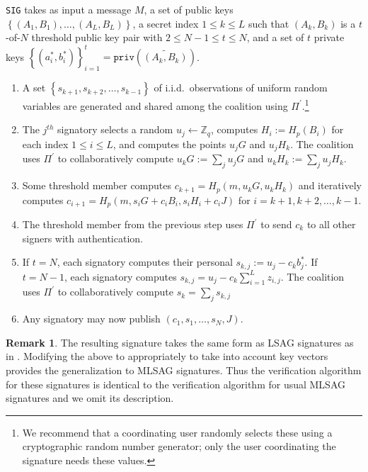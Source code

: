 \documentclass[12pt,english,oneside]{mrl}
\theoremstyle{definition}
\newtheorem{Discussion}[lem]{Remark}
\newenvironment{disc}{\begin{Discussion}\rm}{\end{Discussion}}
\numberwithin{equation}{section}
\numberwithin{figure}{section}
\numberwithin{equation}{section}
\numberwithin{equation}{section}
\numberwithin{figure}{section}
\begin{document}
\texttt{SIG} takes as input a message $M$, a set of public keys $\left\{(A_1, B_1), \ldots, (A_L, B_L)\right\}$, a secret index $1 \leq k \leq L$ such that $(A_k, B_k)$ is a $t$-of-$N$ threshold public key pair with $2 \leq N-1 \leq t \leq N$, and a set of $t$ private keys $\left\{(a^*_i, b^*_i)\right\}_{i=1}^{t}=\texttt{priv}\left(\widetilde{(A_k,B_k)}\right)$.
\begin{enumerate}[(1)]
\item A set $\left\{s_{k+1}, s_{k+2}, \ldots, s_{k-1}\right\}$ of i.i.d.\ observations of uniform random variables are generated and shared among the coalition using $\Pi^{\prime}$.\footnote{We recommend that a coordinating user randomly selects these using a cryptographic random number generator; only the user coordinating the signature needs these values.}
\item The $j^{th}$ signatory selects a random $u_{j} \leftarrow{\mathbb{Z}_q}$, computes $H_i:=H_{p}(B_i)$ for each index $1 \leq i \leq L$, and computes the points $u_jG$ and $u_jH_{k}$. The coalition uses $\Pi^{\prime}$ to collaboratively compute $u_{k}G := \sum_j u_j G$ and $u_k H_k:= \sum_j u_j H_{k}$.

\item Some threshold member computes $c_{k+1} = H_{p}(m, u_{k} G, u_{k} H_{k})$ and iteratively computes $c_{i+1} = H_{p}(m, s_i G + c_i B_i, s_i H_{i} + c_i J)$ for $i=k+1, k+2, \ldots, k-1$.
\item The threshold member from the previous step uses $\Pi^{\prime}$ to send $c_{k}$ to all other signers with authentication.
\item If $t=N$, each signatory computes their personal $s_{k,j} := u_j - c_{k} b_j^*$. If $t=N-1$, each signatory computes $s_{k,j} = u_j - c_{k} \sum_{i=1}^{L}z_{i,j}$. The coalition uses $\Pi^{\prime}$ to collaboratively compute $s_k = \sum_j s_{k,j}$
\item Any signatory may now publish $(c_1, s_1, \ldots, s_N, J)$.
 \end{enumerate}
 
\begin{disc} The resulting signature takes the same form as LSAG signatures as in \cite{liu2004linkable}. Modifying the above to appropriately to take into account key vectors provides the generalization to MLSAG signatures. Thus the verification algorithm for these signatures is identical to the verification algorithm for usual MLSAG signatures and we omit its description.
\end{disc}
 
\end{document}
